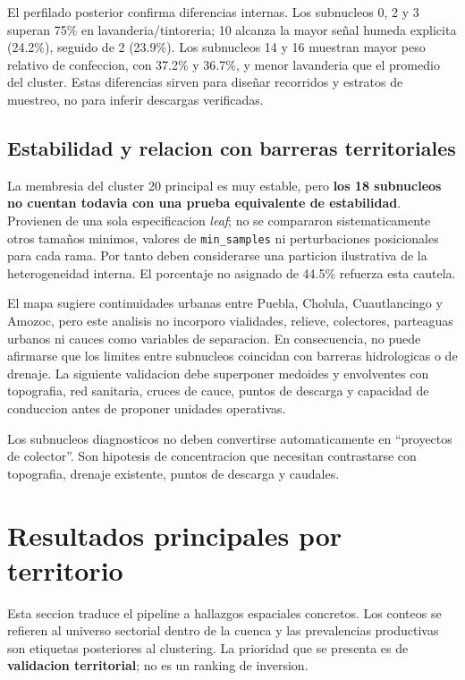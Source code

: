 \documentclass[11pt,letterpaper]{article}
\begin{document}
El perfilado posterior confirma diferencias internas. Los subnucleos 0, 2 y 3 superan 75\% en lavanderia/tintoreria; 10 alcanza la mayor señal humeda explicita (24.2\%), seguido de 2 (23.9\%). Los subnucleos 14 y 16 muestran mayor peso relativo de confeccion, con 37.2\% y 36.7\%, y menor lavanderia que el promedio del cluster. Estas diferencias sirven para diseñar recorridos y estratos de muestreo, no para inferir descargas verificadas.

\subsection{Estabilidad y relacion con barreras territoriales}

La membresia del cluster 20 principal es muy estable, pero \textbf{los 18 subnucleos no cuentan todavia con una prueba equivalente de estabilidad}. Provienen de una sola especificacion \emph{leaf}; no se compararon sistematicamente otros tamaños minimos, valores de \texttt{min\_samples} ni perturbaciones posicionales para cada rama. Por tanto deben considerarse una particion ilustrativa de la heterogeneidad interna. El porcentaje no asignado de 44.5\% refuerza esta cautela.

El mapa sugiere continuidades urbanas entre Puebla, Cholula, Cuautlancingo y Amozoc, pero este analisis no incorporo vialidades, relieve, colectores, parteaguas urbanos ni cauces como variables de separacion. En consecuencia, no puede afirmarse que los limites entre subnucleos coincidan con barreras hidrologicas o de drenaje. La siguiente validacion debe superponer medoides y envolventes con topografia, red sanitaria, cruces de cauce, puntos de descarga y capacidad de conduccion antes de proponer unidades operativas.

\begin{alerta}
Los subnucleos diagnosticos no deben convertirse automaticamente en ``proyectos de colector''. Son hipotesis de concentracion que necesitan contrastarse con topografia, drenaje existente, puntos de descarga y caudales.
\end{alerta}

\section{Resultados principales por territorio}

Esta seccion traduce el pipeline a hallazgos espaciales concretos. Los conteos se refieren al universo sectorial dentro de la cuenca y las prevalencias productivas son etiquetas posteriores al clustering. La prioridad que se presenta es de \textbf{validacion territorial}; no es un ranking de inversion.
\end{document}
